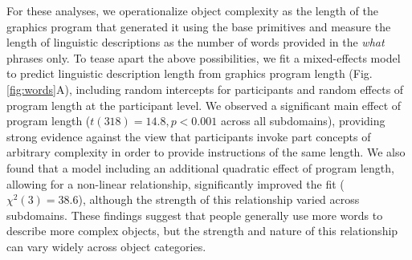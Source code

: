 \documentclass[10pt,letterpaper]{article}
\begin{document}

For these analyses, we operationalize object complexity as the length of the graphics program that generated it using the base primitives and measure the length of linguistic descriptions as the number of words provided in the \textit{what} phrases only.
To tease apart the above possibilities, we fit a mixed-effects model to predict linguistic description length from graphics program length (Fig. \ref{fig:words}A), including random intercepts for participants and random effects of program length at the participant level.
We observed a significant main effect of program length ($t(318)=14.8, p < 0.001$ across all subdomains), providing strong evidence against the view that participants invoke part concepts of arbitrary complexity in order to provide instructions of the same length. 
We also found that a model including an additional quadratic effect of program length, allowing for a non-linear relationship, significantly improved the fit ($\chi^2(3)=38.6$), although the strength of this relationship varied across subdomains.
These findings suggest that people generally use more words to describe more complex objects, but the strength and nature of this relationship can vary widely across object categories. 

\end{document}
